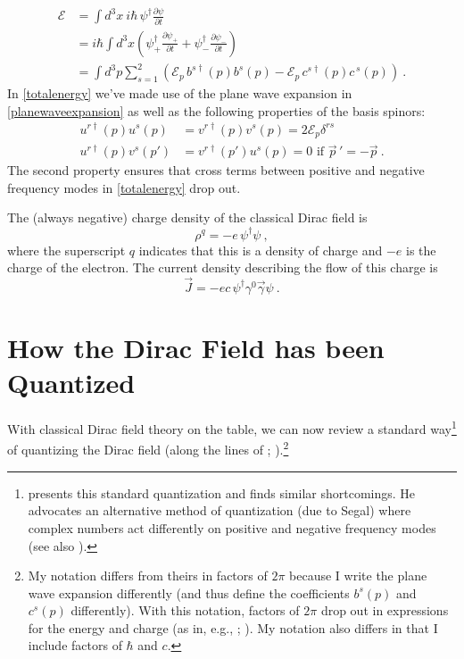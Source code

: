 \documentclass[12pt,secnumarabic,amsmath,amssymb,balancelastpage,nofootinbib]{article}
\begin{document}
\begin{align}
\mathcal{E}&=\int{d^3 x \ i \hbar \, \psi^\dagger\frac{\partial \psi}{\partial t}}
\nonumber
\\
&=i \hbar \int{d^3 x \left( \psi_+^\dagger\frac{\partial \psi_+}{\partial t} + \psi_-^\dagger\frac{\partial \psi_-}{\partial t}\right)}
\nonumber
\\
&=\int{d^3 p \sum_{s=1}^2  \left(\mathcal{E}_p\,b^{s\dagger}(p)b^s(p)-\mathcal{E}_p\,c^{s\dagger}(p)c^{\,s}(p)\right)}
\ .
\label{totalenergy}
\end{align}
In \eqref{totalenergy} we've made use of the plane wave expansion in \eqref{planewaveexpansion} as well as the following properties of the basis spinors:
\begin{align}
u^{r\dagger} (p) u^s (p) &= v^{r\dagger} (p) v^s (p) = 2 \mathcal{E}_p \delta^{r s}
\nonumber
\\
u^{r\dagger} (p)v^s (p')&=v^{r \dagger} (p')u^s (p)=0\mbox{ \ \ if \ \ } \vec{p}\,'=-\vec{p}
\ .
\end{align}
The second property ensures that cross terms between positive and negative frequency modes in \eqref{totalenergy} drop out.


The (always negative) charge density of the classical Dirac field is
\begin{equation}
\rho^q=-e\, \psi^\dagger \psi
\ ,
\label{diracchargedensity}
\end{equation}
where the superscript $q$ indicates that this is a density of charge and $-e$ is the charge of the electron.  The current density describing the flow of this charge is
\begin{equation}
\vec{J}=-e c\, \psi^{\dagger} \gamma^0 \vec{\gamma} \psi
\label{chargecurrentcomplex}
\ .
\end{equation}

\section{How the Dirac Field has been Quantized}\label{howwasquantized}

With classical Dirac field theory on the table, we can now review a standard way\footnote{\citet{saunders1991} presents this standard quantization and finds similar shortcomings.  He advocates an alternative method of quantization (due to Segal) where complex numbers act differently on positive and negative frequency modes (see also \citealp{saunders1992, wallace2009}).} of quantizing the Dirac field (along the lines of \citealp[sec.\ 3.5]{peskinschroeder}; \citealp[ch.\ 5]{tong}).\footnote{My notation differs from theirs in factors of $2\pi$ because I write the plane wave expansion differently (and thus define the coefficients $b^s (p)$ and $c^s (p)$ differently).  With this notation, factors of $2\pi$ drop out in expressions for the energy and charge (as in, e.g., \citealp[ch.\ 8]{schweberQFT}; \citealp[sec.\ 13.4]{bjorkendrellfields}).  My notation also differs in that I include factors of $\hbar$ and $c$.}  
\end{document}
